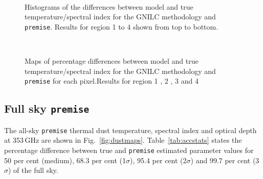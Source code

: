 \documentclass[a4paper,fleqn,usenatbib]{mnras}
\begin{document}
\begin{figure}
\,
\caption{Histograms of the differences between model and true temperature/spectral index for the GNILC methodology and {\texttt{premise}}.  Results for region 1 to 4 shown from top to bottom.}
\label{fig:histAll}
\end{figure}

\begin{figure}
\centering
{}
\,
\caption{Maps of percentage differences between model and true temperature/spectral index for the GNILC methodology and {\texttt{premise}} for each pixel.Results for region 1 \protect{},  2 \protect{}, 3 \protect{} and 4 \protect{}}
\label{fig:mapsAll}
\end{figure}

\subsection{Full sky {\texttt{premise}}}

The all-sky {\texttt{premise}} thermal dust temperature, spectral index and optical depth at 353\,GHz are shown in Fig.~\ref{fig:dustmaps}. Table~\ref{tab:accstats} states the percentage difference between true and {\texttt{premise}} estimated parameter values for 50 per cent (medium), 68.3 per cent (1$\sigma$), 95.4 per cent (2$\sigma$) and 99.7 per cent (3$\sigma$) of the full sky.
\end{document}
